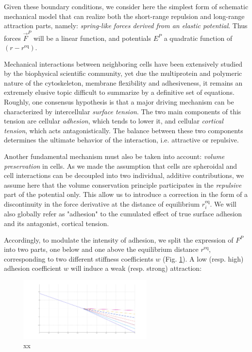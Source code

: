 Given these boundary conditions, we consider here the simplest form of schematic mechanical model that can realize both the short-range repulsion and long-range attraction parts, namely: \textit{spring-like forces derived from an elastic potential}. Thus forces $\vec{F}^P$ will be a linear function, and potentials $E^P$ a quadratic function of $(r-r^{\mathrm{eq}})$.

Mechanical interactions between neighboring cells have been extensively studied by the biophysical scientific community, yet due the multiprotein and polymeric nature of the cytoskeleton, membrane flexibility and adhesiveness, it remains an extremely elusive topic difficult to summarize by a definitive set of equations. Roughly, one consensus hypothesis is that a major driving mechanism can be characterized by intercellular \textit{surface tension}. The two main components of this tension are cellular \textit{adhesion}, which tends to lower it, and cellular \textit{cortical tension}, which acts antagonistically. The balance between these two components determines the ultimate behavior of the interaction, i.e. attractive or repulsive.

Another fundamental mechanism must also be taken into account: \textit{volume preservation} in cells. As we made the assumption that cells are spheroidal and cell interactions can be decoupled into two individual, additive contributions, we assume here that the volume conservation principle participates in the \textit{repulsive} part of the potential only. This allow us to introduce a correction in the form of a discontinuity in the force derivative at the distance of equilibrium $r^{\mathrm{eq}}_i$. We will also globally refer as "adhesion" to the cumulated effect of true surface adhesion and its antagonist, cortical tension.

Accordingly, to modulate the intensity of adhesion, we split the expression of $F^P$ into two parts, one below and one above the equilibrium distance $r^{\mathrm{eq}}$, corresponding to two different stiffness coefficients $w$ (Fig. \ref{potential_potential_linear_force}). A low (resp. high) adhesion coefficient $w$ will induce a weak (resp. strong) attraction:
\begin{figure}
\begin{center}
\includegraphics[width=0.6\textwidth]{../../images/MECAGEN/potential/potential_linear_force.png}
\end{center}
\caption{xx}
\label{potential_potential_linear_force}
\end{figure}

